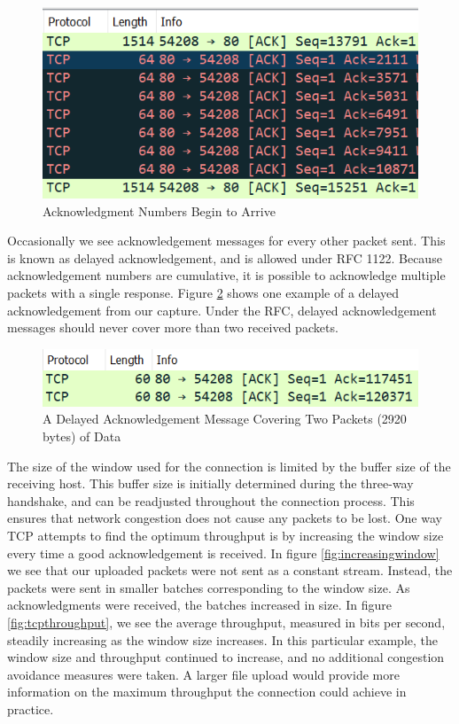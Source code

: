 \documentclass[10pt]{IEEEtran}
\begin{document}
 \begin{figure}[h!]
 \includegraphics[width=\linewidth]{tcpack.png}
 \caption{Acknowledgment Numbers Begin to Arrive}
 \label{fig:tcpack}
 \end{figure}
 
  Occasionally we see acknowledgement messages for every other packet sent. This is known as delayed acknowledgement, and is allowed under RFC 1122. Because acknowledgement numbers are cumulative, it is possible to acknowledge multiple packets with a single response. Figure \ref{fig:delayedack} shows one example of a delayed acknowledgement from our capture. Under the RFC, delayed acknowledgement messages should never cover more than two received packets. 
 
  \begin{figure}[h!]
 \includegraphics[width=\linewidth]{delayedack.png}
 \caption{A Delayed Acknowledgement Message Covering Two Packets (2920 bytes) of Data}
 \label{fig:delayedack}
 \end{figure} 
 
 The size of the window used for the connection is limited by the buffer size of the receiving host. This buffer size is initially determined during the three-way handshake, and can be readjusted throughout the connection process. This ensures that network congestion does not cause any packets to be lost. One way TCP attempts to find the optimum throughput is by increasing the window size every time a good acknowledgement is received. In figure \ref{fig:increasingwindow} we see that our uploaded packets were not sent as a constant stream. Instead, the packets were sent in smaller batches corresponding to the window size. As acknowledgments were received, the batches increased in size.  In figure \ref{fig:tcpthroughput}, we see the average throughput, measured in bits per second, steadily increasing as the window size increases. In this particular example, the window size and throughput continued to increase, and no additional congestion avoidance measures were taken. A larger file upload would provide more information on the maximum throughput the connection could achieve in practice. \\
 
\end{document}
